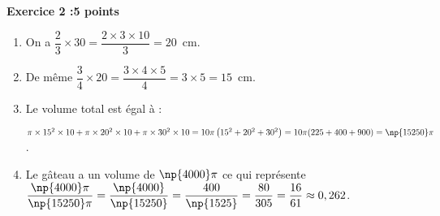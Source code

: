 \textbf{Exercice 2 :\hfill 5 points}

\medskip

%
% 
%
	 	 
\begin{enumerate}
\item %
On a $\dfrac{2}{3} \times 30 = \dfrac{2 \times 3 \times 10}{3} = 20$~cm. 
\item %
De même $\dfrac{3}{4} \times 20 = \dfrac{3 \times 4 \times 5}{4} = 3 \times 5 = 15$~cm.
\item %
 
Le volume total est égal à :

$\pi\times 15^2 \times 10 + \pi\times 20^2 \times 10 + \pi\times 30^2 \times 10 = 10\pi\left(15^2 + 20^2 + 30^2 \right) = 10\pi(225 + 400 + 900) = \np{15250}\pi$. 
\item %
Le gâteau  a un volume de $\np{4000}\pi$ ce qui représente $\dfrac{\np{4000}\pi}{\np{15250}\pi} = \dfrac{\np{4000}}{\np{15250}} = \dfrac{400}{\np{1525}} = \dfrac{80}{305} = \dfrac{16}{61} \approx 0,262$.
\end{enumerate}

\bigskip

